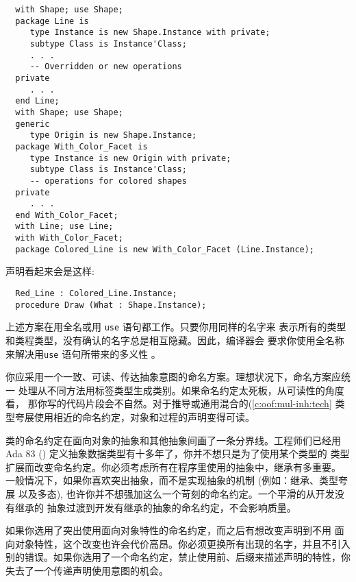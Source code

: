 \begin{blockindent}
\begin{lstlisting}
  with Shape; use Shape;
  package Line is
     type Instance is new Shape.Instance with private;
     subtype Class is Instance'Class;
     . . .
     -- Overridden or new operations
  private
     . . .
  end Line;
  with Shape; use Shape;
  generic
     type Origin is new Shape.Instance;
  package With_Color_Facet is
     type Instance is new Origin with private;
     subtype Class is Instance'Class;
     -- operations for colored shapes
  private
     . . .
  end With_Color_Facet;
  with Line; use Line;
  with With_Color_Facet;
  package Colored_Line is new With_Color_Facet (Line.Instance);
\end{lstlisting}
声明看起来会是这样:
\begin{lstlisting}
  Red_Line : Colored_Line.Instance;
  procedure Draw (What : Shape.Instance);
\end{lstlisting}
上述方案在用全名或用 \texttt{use} 语句都工作。只要你用同样的名字来
表示所有的类型和类程类型，没有确认的名字总是相互隐藏。因此，编译器会
要求你使用全名称来解决用\texttt{use} 语句所带来的多义性 \cite{rosen95}。
\end{blockindent}

\begin{blockindent}
你应采用一个一致、可读、传达抽象意图的命名方案。理想状况下，命名方案应统一
处理从不同方法用标签类型生成类别。如果命名约定太死板，从可读性的角度看，
那你写的代码片段会不自然。对于推导或通用混合的(\ref{c:oof:mul-inh:tech}
类型夸展使用相近的命名约定，对象和过程的声明变得可读。
\end{blockindent}

\begin{blockindent}
类的命名约定在面向对象的抽象和其他抽象间画了一条分界线。工程师们已经用 Ada 83
(\cite{arm83}) 定义抽象数据类型有十多年了，你并不想只是为了使用某个类型的
类型扩展而改变命名约定。你必须考虑所有在程序里使用的抽象中，继承有多重要。
一般情况下，如果你喜欢突出抽象，而不是实现抽象的机制 (例如：继承、类型夸展
以及多态), 也许你并不想强加这么一个苛刻的命名约定。一个平滑的从开发没有继承的
抽象过渡到开发有继承的抽象的命名约定，不会影响质量。

如果你选用了突出使用面向对象特性的命名约定，而之后有想改变声明到不用
面向对象特性，这个改变也许会代价高昂。你必须更换所有出现的名字，并且不引入
别的错误。如果你选用了一个命名约定，禁止使用前、后缀来描述声明的特性，你
失去了一个传递声明使用意图的机会。
\end{blockindent}

